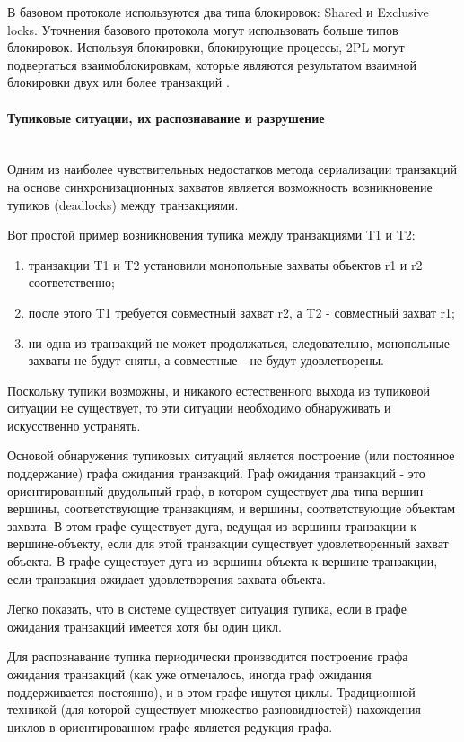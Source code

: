 В базовом протоколе используются два типа блокировок: Shared и Exclusive locks. Уточнения базового протокола могут использовать больше типов блокировок. Используя блокировки, блокирующие процессы, 2PL могут подвергаться взаимоблокировкам, которые являются результатом взаимной блокировки двух или более транзакций \autocite{Wiki}.

\paragraph{Тупиковые ситуации, их распознавание и разрушение} ~\\

Одним из наиболее чувствительных недостатков метода сериализации транзакций на основе синхронизационных захватов является возможность возникновение тупиков (deadlocks) между транзакциями.

Вот простой пример возникновения тупика между транзакциями T1 и T2:
\begin{enumerate}
\item транзакции T1 и T2 установили монопольные захваты объектов r1 и r2 соответственно;
\item после этого T1 требуется совместный захват r2, а T2 - совместный захват r1;
\item ни одна из транзакций не может продолжаться, следовательно, монопольные захваты не будут сняты, а совместные - не будут удовлетворены.
\end{enumerate}
Поскольку тупики возможны, и никакого естественного выхода из тупиковой ситуации не существует, то эти ситуации необходимо обнаруживать и искусственно устранять.

Основой обнаружения тупиковых ситуаций является построение (или постоянное поддержание) графа ожидания транзакций. Граф ожидания транзакций - это ориентированный двудольный граф, в котором существует два типа вершин - вершины, соответствующие транзакциям, и вершины, соответствующие объектам захвата. В этом графе существует дуга, ведущая из вершины-транзакции к вершине-объекту, если для этой транзакции существует удовлетворенный захват объекта. В графе существует дуга из вершины-объекта к вершине-транзакции, если транзакция ожидает удовлетворения захвата объекта.

Легко показать, что в системе существует ситуация тупика, если в графе ожидания транзакций имеется хотя бы один цикл.

Для распознавание тупика периодически производится построение графа ожидания транзакций (как уже отмечалось, иногда граф ожидания поддерживается постоянно), и в этом графе ищутся циклы. Традиционной техникой (для которой существует множество разновидностей) нахождения циклов в ориентированном графе является редукция графа.

